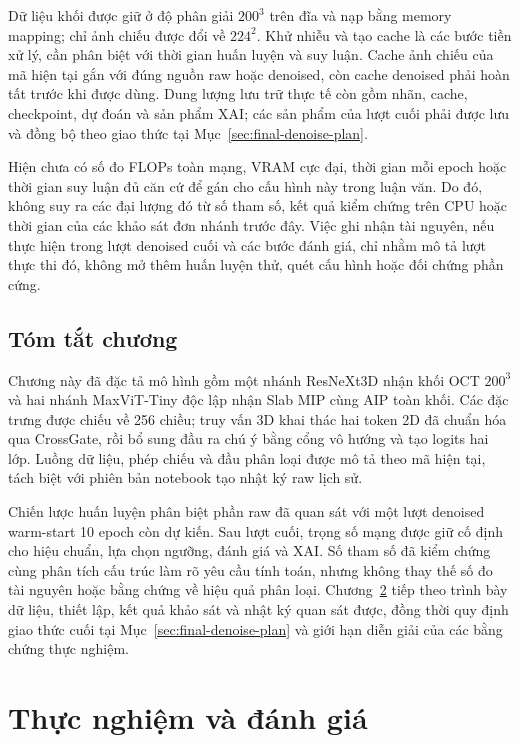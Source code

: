 \documentclass[14pt,a4paper,oneside]{extreport}
\begin{document}
Dữ liệu khối được giữ ở độ phân giải $200^3$ trên đĩa và nạp bằng
memory mapping; chỉ ảnh chiếu được đổi về $224^2$. Khử nhiễu và tạo
cache là các bước tiền xử lý, cần phân biệt với thời gian huấn luyện
và suy luận. Cache ảnh chiếu của mã hiện tại gắn với đúng nguồn raw
hoặc denoised, còn cache denoised phải hoàn tất trước khi được dùng.
Dung lượng lưu trữ thực tế còn gồm nhãn, cache, checkpoint, dự đoán
và sản phẩm XAI; các sản phẩm của lượt cuối phải được lưu và đồng bộ
theo giao thức tại Mục~\ref{sec:final-denoise-plan}.

Hiện chưa có số đo FLOPs toàn mạng, VRAM cực đại, thời gian mỗi epoch
hoặc thời gian suy luận đủ căn cứ để gán cho cấu hình này trong luận
văn. Do đó, không suy ra các đại lượng đó từ số tham số, kết quả kiểm
chứng trên CPU hoặc thời gian của các khảo sát đơn nhánh trước đây.
Việc ghi nhận tài nguyên, nếu thực hiện trong lượt denoised cuối và
các bước đánh giá, chỉ nhằm mô tả lượt thực thi đó, không mở thêm
huấn luyện thử, quét cấu hình hoặc đối chứng phần cứng.

\section{Tóm tắt chương}
Chương này đã đặc tả mô hình gồm một nhánh ResNeXt3D nhận khối OCT
$200^3$ và hai nhánh MaxViT-Tiny độc lập nhận Slab MIP cùng AIP toàn
khối. Các đặc trưng được chiếu về 256 chiều; truy vấn 3D khai thác hai
token 2D đã chuẩn hóa qua CrossGate, rồi bổ sung đầu ra chú ý bằng
cổng vô hướng và tạo logits hai lớp. Luồng dữ liệu, phép chiếu và
đầu phân loại được mô tả theo mã hiện tại, tách biệt với phiên bản
notebook tạo nhật ký raw lịch sử.

Chiến lược huấn luyện phân biệt phần raw đã quan sát với một lượt
denoised warm-start 10 epoch còn dự kiến. Sau lượt cuối, trọng số mạng
được giữ cố định cho hiệu chuẩn, lựa chọn ngưỡng, đánh giá và XAI.
Số tham số đã kiểm chứng cùng phân tích cấu trúc làm rõ yêu cầu tính
toán, nhưng không thay thế số đo tài nguyên hoặc bằng chứng về hiệu
quả phân loại. Chương~\ref{chap:experiments} tiếp theo trình bày dữ
liệu, thiết lập, kết quả khảo sát và nhật ký quan sát được, đồng thời
quy định giao thức cuối tại Mục~\ref{sec:final-denoise-plan} và giới
hạn diễn giải của các bằng chứng thực nghiệm.

\chapter{Thực nghiệm và đánh giá}
\label{chap:experiments}
\end{document}
